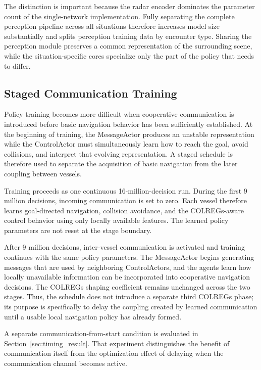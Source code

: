 \documentclass[final,5p,times,twocolumn]{elsarticle}
\begin{document}
{The distinction is important because the radar encoder dominates the parameter count of the single-network implementation. Fully separating the complete perception pipeline across all situations therefore increases model size substantially and splits perception training data by encounter type. Sharing the perception module preserves a common representation of the surrounding scene, while the situation-specific cores specialize only the part of the policy that needs to differ.
}

\subsection{Staged Communication Training}
\label{sec:staged_training}
{\color{violet}
Policy training becomes more difficult when cooperative communication is introduced before basic navigation behavior has been sufficiently established. At the beginning of training, the MessageActor produces an unstable representation while the ControlActor must simultaneously learn how to reach the goal, avoid collisions, and interpret that evolving representation. A staged schedule is therefore used to separate the acquisition of basic navigation from the later coupling between vessels.

Training proceeds as one continuous 16-million-decision run. During the first 9 million decisions, incoming communication is set to zero. Each vessel therefore learns goal-directed navigation, collision avoidance, and the COLREGs-aware control behavior using only locally available features. The learned policy parameters are not reset at the stage boundary.

After 9 million decisions, inter-vessel communication is activated and training continues with the same policy parameters. The MessageActor begins generating messages that are used by neighboring ControlActors, and the agents learn how locally unavailable information can be incorporated into cooperative navigation decisions. The COLREGs shaping coefficient remains unchanged across the two stages. Thus, the schedule does not introduce a separate third COLREGs phase; its purpose is specifically to delay the coupling created by learned communication until a usable local navigation policy has already formed.

A separate communication-from-start condition is evaluated in Section~\ref{sec:timing_result}. That experiment distinguishes the benefit of communication itself from the optimization effect of delaying when the communication channel becomes active.
}
\end{document}
